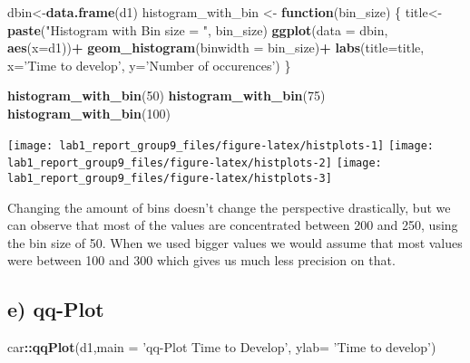 \documentclass[
]{article}
\newenvironment{Shaded}{\begin{snugshade}}{\end{snugshade}}
\newcommand{\ControlFlowTok}[1]{\textcolor[rgb]{0.13,0.29,0.53}{\textbf{#1}}}
\newcommand{\DataTypeTok}[1]{\textcolor[rgb]{0.13,0.29,0.53}{#1}}
\newcommand{\DecValTok}[1]{\textcolor[rgb]{0.00,0.00,0.81}{#1}}
\newcommand{\KeywordTok}[1]{\textcolor[rgb]{0.13,0.29,0.53}{\textbf{#1}}}
\newcommand{\NormalTok}[1]{#1}
\newcommand{\OperatorTok}[1]{\textcolor[rgb]{0.81,0.36,0.00}{\textbf{#1}}}
\newcommand{\StringTok}[1]{\textcolor[rgb]{0.31,0.60,0.02}{#1}}
\begin{document}
\begin{Shaded}
\begin{Highlighting}[]
\NormalTok{dbin<-}\KeywordTok{data.frame}\NormalTok{(d1)}
\NormalTok{histogram_with_bin <-}\StringTok{ }\ControlFlowTok{function}\NormalTok{(bin_size) \{}
\NormalTok{  title<-}\StringTok{ }\KeywordTok{paste}\NormalTok{(}\StringTok{"Histogram with Bin size = "}\NormalTok{, bin_size)}
  \KeywordTok{ggplot}\NormalTok{(}\DataTypeTok{data =}\NormalTok{ dbin, }\KeywordTok{aes}\NormalTok{(}\DataTypeTok{x=}\NormalTok{d1))}\OperatorTok{+}
\StringTok{  }\KeywordTok{geom_histogram}\NormalTok{(}\DataTypeTok{binwidth =}\NormalTok{ bin_size)}\OperatorTok{+}
\StringTok{  }\KeywordTok{labs}\NormalTok{(}\DataTypeTok{title=}\NormalTok{title, }\DataTypeTok{x=}\StringTok{'Time to develop'}\NormalTok{, }\DataTypeTok{y=}\StringTok{'Number of occurences'}\NormalTok{)}
\NormalTok{\}}

\KeywordTok{histogram_with_bin}\NormalTok{(}\DecValTok{50}\NormalTok{)}
\KeywordTok{histogram_with_bin}\NormalTok{(}\DecValTok{75}\NormalTok{)}
\KeywordTok{histogram_with_bin}\NormalTok{(}\DecValTok{100}\NormalTok{)}
\end{Highlighting}
\end{Shaded}

\texttt{[image: lab1\_report\_group9\_files/figure-latex/histplots-1]}
\texttt{[image: lab1\_report\_group9\_files/figure-latex/histplots-2]}
\texttt{[image: lab1\_report\_group9\_files/figure-latex/histplots-3]}

Changing the amount of bins doesn't change the perspective drastically,
but we can observe that most of the values are concentrated between 200
and 250, using the bin size of 50. When we used bigger values we would
assume that most values were between 100 and 300 which gives us much
less precision on that.

\hypertarget{e-qq-plot}{%
\subsection{e) qq-Plot}\label{e-qq-plot}}

\begin{Shaded}
\begin{Highlighting}[]
\NormalTok{car}\OperatorTok{::}\KeywordTok{qqPlot}\NormalTok{(d1,}\DataTypeTok{main =} \StringTok{'qq-Plot Time to Develop'}\NormalTok{, }\DataTypeTok{ylab=} \StringTok{'Time to develop'}\NormalTok{)}
\end{Highlighting}
\end{Shaded}
\end{document}
